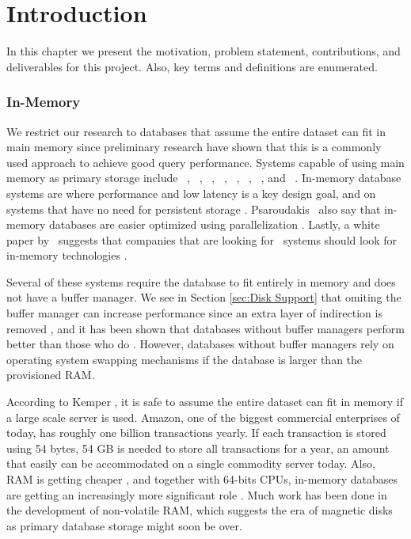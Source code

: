 \chapter{Introduction}
\label{chap:introduction}
In this chapter we present the motivation, problem statement, contributions, and deliverables for this project. Also, key terms and definitions are enumerated.
\clearpage





\subsection{In-Memory}
\label{sub:In-Memory}
We restrict our research to databases that assume the entire dataset can fit in main memory since preliminary research have shown that this is a commonly used approach to achieve good query performance. Systems capable of using main memory as primary storage include \oracle~\cite{Lahiri2015-mz}, \saph~\cite{Farber2012-vh}, \gorilla~\cite{Pelkonen2015-ko}, \qlikview~\cite{Qlik2011-ef}, \tableau~\cite{Kamkolkar2015-iq}, \monetdb~\cite{Boncz2002-yj}, \blink~\cite{Barber2012-xt}, and \sapnw~\cite{Lemke2010-is}. In-memory database systems are where performance and low latency is a key design goal, and on systems that have no need for persistent storage \cite{Zicari2012-is}. Psaroudakis \ea~also say that in-memory databases are easier optimized using parallelization \cite{Psaroudakis2013-fn}. Lastly, a white paper by \qlikview~suggests that companies that are looking for \bi~systems should look for in-memory technologies \cite{Bereanu2010-tj}. 

Several of these systems require the database to fit entirely in memory and does not have a buffer manager. We see in Section \ref{sec:Disk Support} that omiting the buffer manager can increase performance since an extra layer of indirection is removed \cite{Graefe2014-ds}, and it has been shown that databases without buffer managers perform better than those who do \cite{Ferrari2012-hm}. However, databases without buffer managers rely on operating system swapping mechanisms if the database is larger than the provisioned RAM.

According to Kemper \ea, it is safe to assume the entire dataset can fit in memory \cite{Kemper2011-ap} if a large scale server is used. Amazon, one of the biggest commercial enterprises of today, has roughly one billion transactions yearly. If each transaction is stored using 54 bytes, 54 GB is needed to store all transactions for a year, an amount that easily can be accommodated on a single commodity server today. Also, RAM is getting cheaper \cite{Exasol2014-xh}, and together with 64-bits CPUs, in-memory databases are getting an increasingly more significant role \cite{Delaney2014-ip}. Much work has been done in the development of non-volatile RAM, which suggests the era of magnetic disks as primary database storage might soon be over.

